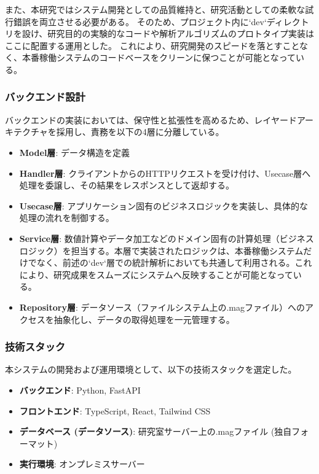 また、本研究ではシステム開発としての品質維持と、研究活動としての柔軟な試行錯誤を両立させる必要がある。
そのため、プロジェクト内に`dev`ディレクトリを設け、研究目的の実験的なコードや解析アルゴリズムのプロトタイプ実装はここに配置する運用とした。
これにより、研究開発のスピードを落とすことなく、本番稼働システムのコードベースをクリーンに保つことが可能となっている。

\subsubsection{バックエンド設計}
バックエンドの実装においては、保守性と拡張性を高めるため、レイヤードアーキテクチャを採用し、責務を以下の4層に分離している。

\begin{itemize}
  \item \textbf{Model層}: データ構造を定義
  \item \textbf{Handler層}: クライアントからのHTTPリクエストを受け付け、Usecase層へ処理を委譲し、その結果をレスポンスとして返却する。
  \item \textbf{Usecase層}: アプリケーション固有のビジネスロジックを実装し、具体的な処理の流れを制御する。
  \item \textbf{Service層}: 数値計算やデータ加工などのドメイン固有の計算処理（ビジネスロジック）を担当する。本層で実装されたロジックは、本番稼働システムだけでなく、前述の`dev`層での統計解析においても共通して利用される。これにより、研究成果をスムーズにシステムへ反映することが可能となっている。
  \item \textbf{Repository層}: データソース（ファイルシステム上の.magファイル）へのアクセスを抽象化し、データの取得処理を一元管理する。
\end{itemize}

\subsubsection{技術スタック}
本システムの開発および運用環境として、以下の技術スタックを選定した。

\begin{itemize}
  \item \textbf{バックエンド}: Python, FastAPI
  \item \textbf{フロントエンド}: TypeScript, React, Tailwind CSS
  \item \textbf{データベース (データソース)}: 研究室サーバー上の.magファイル (独自フォーマット)
  \item \textbf{実行環境}: オンプレミスサーバー
\end{itemize}

